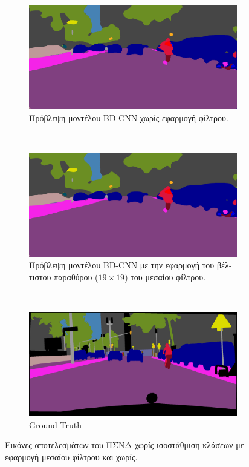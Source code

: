 \begin{figure}[H]
 \centering
 \begin{subfigure}[b]{\linewidth}
 \centering
 \includegraphics[width=0.8\linewidth]{Images/image_predictions_HighREs_512_11}
  \caption{\textgreek{Πρόβλεψη μοντέλου }BD-CNN \textgreek{χωρίς εφαρμογή φίλτρου}.}
  \end{subfigure}
 ~
 \begin{subfigure}[b]{\linewidth}
 \centering
 \includegraphics[width=0.8\linewidth]{Images/image_predictions_HighREs_median_512_11}
  \caption{\textgreek{Πρόβλεψη μοντέλου }BD-CNN \textgreek{με την εφαρμογή του βέλτιστου παραθύρου ($19\times 19$) του μεσαίου φίλτρου}.}
  \end{subfigure}
  ~
  \begin{subfigure}[b]{\linewidth}
  \centering
  \includegraphics[width=0.8\linewidth]{Images/frankfurt_000000_015676_gtFine_color}
  \caption{Ground Truth}
 \end{subfigure}
  \caption[\textgreek{Εικόνες Διγραμμικών ΠΣΝΔ}]{\textgreek{Εικόνες αποτελεσμάτων του ΠΣΝΔ χωρίς ισοστάθμιση κλάσεων με εφαρμογή μεσαίου φίλτρου και χωρίς.}}
 \label{fig:image_results_3}
\end{figure}

